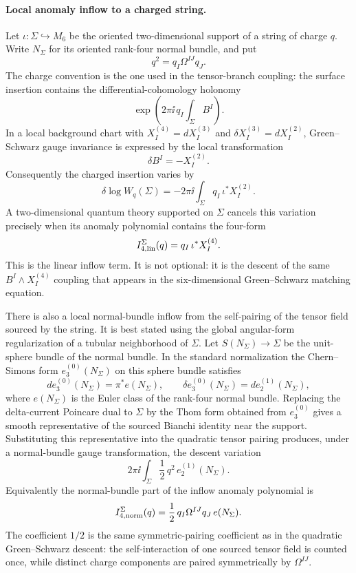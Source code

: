 \paragraph{Local anomaly inflow to a charged string.}
Let \(\iota:\Sigma\hookrightarrow M_6\) be the oriented two-dimensional
support of a string of charge \(q\).  Write \(N_\Sigma\) for its oriented
rank-four normal bundle, and put
\[
  q^2=q_I\Omega^{IJ}q_J .
\]
The charge convention is the one used in the tensor-branch coupling:
the surface insertion contains the differential-cohomology holonomy
\[
  \exp\!\left(2\pi\ii\,q_I\int_\Sigma B^I\right).
\]
In a local background chart with \(X_I^{(4)}=dX_I^{(3)}\) and
\(\delta X_I^{(3)}=dX_I^{(2)}\), Green--Schwarz gauge invariance is expressed
by the local transformation
\[
  \delta B^I=-X_I^{(2)} .
\]
Consequently the charged insertion varies by
\[
  \delta\log W_q(\Sigma)
  =
  -2\pi\ii\int_\Sigma q_I\,\iota^\ast X_I^{(2)} .
\]
A two-dimensional quantum theory supported on \(\Sigma\) cancels this
variation precisely when its anomaly polynomial contains the four-form
\begin{equation}
  I_{4,\rm lin}^{\Sigma}(q)
  =
  q_I\,\iota^\ast X_I^{(4)} .
  \label{eq:six-d-string-linear-inflow}
\end{equation}
This is the linear inflow term.  It is not optional: it is the descent of the
same \(B^I\wedge X_I^{(4)}\) coupling that appears in the six-dimensional
Green--Schwarz matching equation.

There is also a local normal-bundle inflow from the self-pairing of the
tensor field sourced by the string.  It is best stated using the global
angular-form regularization of a tubular neighborhood of \(\Sigma\).  Let
\(S(N_\Sigma)\to\Sigma\) be the unit-sphere bundle of the normal bundle.  In
the standard normalization the Chern--Simons form
\(e_3^{(0)}(N_\Sigma)\) on this sphere bundle satisfies
\[
  de_3^{(0)}(N_\Sigma)=\pi^\ast e(N_\Sigma),
  \qquad
  \delta e_3^{(0)}(N_\Sigma)=d e_2^{(1)}(N_\Sigma),
\]
where \(e(N_\Sigma)\) is the Euler class of the rank-four normal bundle.
Replacing the delta-current Poincare dual to \(\Sigma\) by the Thom form
obtained from \(e_3^{(0)}\) gives a smooth representative of the sourced
Bianchi identity near the support.  Substituting this representative into the
quadratic tensor pairing produces, under a normal-bundle gauge
transformation, the descent variation
\[
  2\pi\ii\int_\Sigma
  \frac12\,q^2\,e_2^{(1)}(N_\Sigma).
\]
Equivalently the normal-bundle part of the inflow anomaly polynomial is
\begin{equation}
  I_{4,\rm norm}^{\Sigma}(q)
  =
  \frac12\,q_I\Omega^{IJ}q_J\,e(N_\Sigma).
  \label{eq:six-d-string-normal-inflow}
\end{equation}
The coefficient \(1/2\) is the same symmetric-pairing coefficient as in the
quadratic Green--Schwarz descent: the self-interaction of one sourced tensor
field is counted once, while distinct charge components are paired
symmetrically by \(\Omega^{IJ}\).

